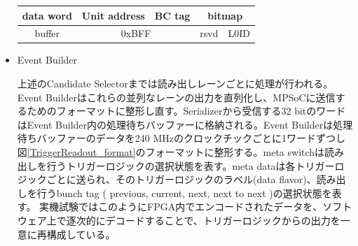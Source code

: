 \begin{itemize}
\begin{table}[]
\begin{tabular}{|c|cccccccccccccccccccccccccccccccc|}
        data word & \multicolumn{6}{c|}{Unit address}                                                                                                                         & \multicolumn{2}{c|}{BC tag}                       & \multicolumn{24}{c|}{bitmap}                                                                                                                                                                                                                                                                                                                                                                                                                                                                                                                                                                                   \\ \hline
        buffer    & \multicolumn{12}{c|}{0xBFF}                                                                                                                                                                                                                                                                                           & \multicolumn{9}{c|}{rsvd}                                                                                                                                                                                                               & \multicolumn{11}{c|}{L0ID}                                                                                                                                                                                                                                   \\ \hline
        \end{tabular}
    \end{table}

    \item Event Builder　　
    \par
    上述のCandidate Selectorまでは読み出しレーンごとに処理が行われる。Event Builderはこれらの並列なレーンの出力を直列化し、MPSoCに送信するためのフォーマットに整形し直す。Serializerから受信する32 bitのワードはEvent Builder内の処理待ちバッファーに格納される。Event Builderは処理待ちバッファーのデータを240 MHzのクロックチックごとに1ワードずつし図\ref{TriggerReadout_format}のフォーマットに整形する。meta switchは読み出しを行うトリガーロジックの選択状態を表す。meta dataは各トリガーロジックごとに送られ、そのトリガーロジックのラベル(data flavor)、読み出しを行うbunch tag ( previous, current, next, next to next )の選択状態を表す。
    実機試験ではこのようにFPGA内でエンコードされたデータを、ソフトウェア上で逐次的にデコードすることで、トリガーロジックからの出力を一意に再構成している。


\end{itemize}
